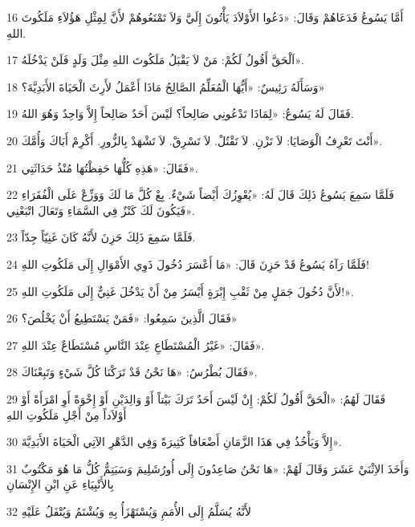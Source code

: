 \par 16 أَمَّا يَسُوعُ فَدَعَاهُمْ وَقَالَ: «دَعُوا الأَوْلاَدَ يَأْتُونَ إِلَيَّ وَلاَ تَمْنَعُوهُمْ لأَنَّ لِمِثْلِ هَؤُلاَءِ مَلَكُوتَ اللهِ.
\par 17 اَلْحَقَّ أَقُولُ لَكُمْ: مَنْ لاَ يَقْبَلُ مَلَكُوتَ اللهِ مِثْلَ وَلَدٍ فَلَنْ يَدْخُلَهُ».
\par 18 وَسَأَلَهُ رَئِيسٌ: «أَيُّهَا الْمُعَلِّمُ الصَّالِحُ مَاذَا أَعْمَلُ لأَرِثَ الْحَيَاةَ الأَبَدِيَّةَ؟»
\par 19 فَقَالَ لَهُ يَسُوعُ: «لِمَاذَا تَدْعُونِي صَالِحاً؟ لَيْسَ أَحَدٌ صَالِحاً إِلاَّ وَاحِدٌ وَهُوَ اللهُ.
\par 20 أَنْتَ تَعْرِفُ الْوَصَايَا: لاَ تَزْنِ. لاَ تَقْتُلْ. لاَ تَسْرِقْ. لاَ تَشْهَدْ بِالزُّورِ. أَكْرِمْ أَبَاكَ وَأُمَّكَ».
\par 21 فَقَالَ: «هَذِهِ كُلُّهَا حَفِظْتُهَا مُنْذُ حَدَاثَتِي».
\par 22 فَلَمَّا سَمِعَ يَسُوعُ ذَلِكَ قَالَ لَهُ: «يُعْوِزُكَ أَيْضاً شَيْءٌ. بِعْ كُلَّ مَا لَكَ وَوَزِّعْ عَلَى الْفُقَرَاءِ فَيَكُونَ لَكَ كَنْزٌ فِي السَّمَاءِ وَتَعَالَ اتْبَعْنِي».
\par 23 فَلَمَّا سَمِعَ ذَلِكَ حَزِنَ لأَنَّهُ كَانَ غَنِيّاً جِدّاً.
\par 24 فَلَمَّا رَآهُ يَسُوعُ قَدْ حَزِنَ قَالَ: «مَا أَعْسَرَ دُخُولَ ذَوِي الأَمْوَالِ إِلَى مَلَكُوتِ اللهِ!
\par 25 لأَنَّ دُخُولَ جَمَلٍ مِنْ ثَقْبِ إِبْرَةٍ أَيْسَرُ مِنْ أَنْ يَدْخُلَ غَنِيٌّ إِلَى مَلَكُوتِ اللهِ!».
\par 26 فَقَالَ الَّذِينَ سَمِعُوا: «فَمَنْ يَسْتَطِيعُ أَنْ يَخْلُصَ؟»
\par 27 فَقَالَ: «غَيْرُ الْمُسْتَطَاعِ عِنْدَ النَّاسِ مُسْتَطَاعٌ عِنْدَ اللهِ».
\par 28 فَقَالَ بُطْرُسُ: «هَا نَحْنُ قَدْ تَرَكْنَا كُلَّ شَيْءٍ وَتَبِعْنَاكَ».
\par 29 فَقَالَ لَهُمُ: «الْحَقَّ أَقُولُ لَكُمْ: إِنْ لَيْسَ أَحَدٌ تَرَكَ بَيْتاً أَوْ وَالِدَيْنِ أَوْ إِخْوَةً أَوِ امْرَأَةً أَوْ أَوْلاَداً مِنْ أَجْلِ مَلَكُوتِ اللهِ
\par 30 إِلاَّ وَيَأْخُذُ فِي هَذَا الزَّمَانِ أَضْعَافاً كَثِيرَةً وَفِي الدَّهْرِ الآتِي الْحَيَاةَ الأَبَدِيَّةَ».
\par 31 وَأَخَذَ الاِثْنَيْ عَشَرَ وَقَالَ لَهُمْ: «هَا نَحْنُ صَاعِدُونَ إِلَى أُورُشَلِيمَ وَسَيَتِمُّ كُلُّ مَا هُوَ مَكْتُوبٌ بِالأَنْبِيَاءِ عَنِ ابْنِ الإِنْسَانِ
\par 32 لأَنَّهُ يُسَلَّمُ إِلَى الأُمَمِ وَيُسْتَهْزَأُ بِهِ وَيُشْتَمُ وَيُتْفَلُ عَلَيْهِ
